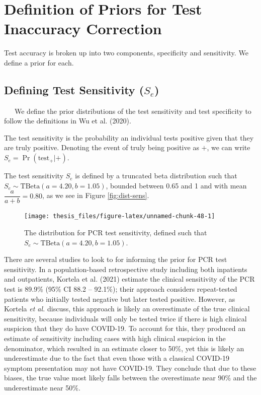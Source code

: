 \documentclass[12pt,twoside]{smiththesis}
\begin{document}
\hypertarget{definition-of-priors-for-test-inaccuracy-correction}{%
\section{Definition of Priors for Test Inaccuracy Correction}\label{definition-of-priors-for-test-inaccuracy-correction}}

Test accuracy is broken up into two components, specificity and sensitivity. We define a prior for each.

\hypertarget{defining-test-sensitivity-s_e}{%
\subsection{\texorpdfstring{Defining Test Sensitivity (\(S_e\))}{Defining Test Sensitivity (S\_e)}}\label{defining-test-sensitivity-s_e}}

~~~We define the prior distributions of the test sensitivity and test specificity to follow the definitions in Wu et al. (2020).

The test sensitivity is the probability an individual tests positive given that they are truly positive. Denoting the event of truly being positive as \(+\), we can write \(S_e = \Pr(\text{test}_+|+)\).

The test sensitivity \(S_e\) is defined by a truncated beta distribution such that \(S_e \sim \text{TBeta}(a= 4.20, b= 1.05)\), bounded between 0.65 and 1 and with mean \(\dfrac{a}{a+b} = 0.80\), as we see in Figure \ref{fig:dist-sens}.
\begin{figure}

{\centering \texttt{[image: thesis\_files/figure-latex/unnamed-chunk-48-1]} 

}

\caption{\label{fig:dist-sens} The distribution for PCR test sensitivity, defined such that  $S_e \sim \text{TBeta}(a= 4.20, b=     1.05)$.}\label{fig:unnamed-chunk-48}
\end{figure}
There are several studies to look to for informing the prior for PCR test sensitivity. In a population-based retrospective study including both inpatients and outpatients, Kortela et al. (2021) estimate the clinical sensitivity of the PCR test is 89.9\% (95\% CI 88.2 -- 92.1\%); their approach considers repeat-tested patients who initially tested negative but later tested positive. However, as Kortela \emph{et al.} discuss, this approach is likely an overestimate of the true clinical sensitivity, because individuals will only be tested twice if there is high clinical suspicion that they do have COVID-19. To account for this, they produced an estimate of sensitivity including cases with high clinical suspicion in the denominator, which resulted in an estimate closer to 50\%, yet this is likely an underestimate due to the fact that even those with a classical COVID-19 symptom presentation may not have COVID-19. They conclude that due to these biases, the true value most likely falls between the overestimate near 90\% and the underestimate near 50\%.
\end{document}
